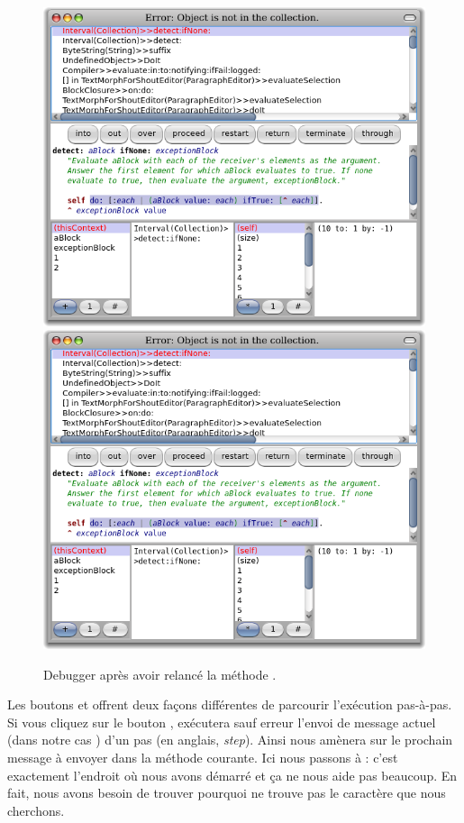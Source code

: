\documentclass[a4paper,10pt,twoside]{book}
\begin{document}
\begin{figure}[btp]
	\begin{center}
	\ifluluelse
		{\includegraphics[width=\textwidth]{RestartDetectIfNone}}
		{\includegraphics[scale=0.7]{RestartDetectIfNone}}
	\end{center}
	\caption{Debugger apr\`es avoir relanc\'e la m\'ethode .}
	\label{fig:RestartDetectIfNone}
\end{figure}

Les boutons  et  offrent deux fa\c{c}ons diff\'erentes de parcourir l'ex\'ecution pas-\`a-pas.
Si vous cliquez sur le bouton , \pharo ex\'ecutera sauf erreur
l'envoi de message actuel (dans notre cas ) d'un pas (en anglais, \emph{step}).
Ainsi  nous am\`enera sur 
le prochain message \`a envoyer dans la m\'ethode courante. Ici nous
passons \`a : c'est exactement l'endroit o\`u nous avons d\'emarr\'e
et \c{c}a ne nous aide pas beaucoup.
En fait, nous avons besoin de trouver pourquoi  ne trouve pas
le caract\`ere que nous cherchons.
\end{document}
